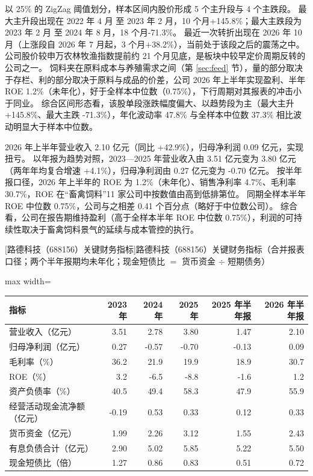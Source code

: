  以 25\% 的 ZigZag 阈值划分，样本区间内股价形成 5 个主升段与 4 个主跌段。 最大主升段出现在 2022 年 4 月 至 2023 年 2 月，10 个月+145.8\%；最大主跌段为 2023 年 2 月 至 2024 年 8 月，18 个月-71.3\%。 最近一次转折出现在 2026 年 10 月（上涨段自 2026 年 7 月起，3 个月+38.2\%），当前处于该段之后的震荡之中。 公司股价较申万农林牧渔指数提前约 21 个月见底，是板块中较早定价周期反转的公司之一。 饲料夹在原料成本与养殖需求之间（第 \ref{sec:feed} 节），量的部分取决于存栏、利的部分取决于原料与成品的价差，公司 2026 年上半年实现盈利、半年 ROE 1.2\%（未年化），好于全样本中位数（0.75\%），下行周期对其报表的冲击小于同业。 综合区间形态看，该股单段涨跌幅度偏大、以趋势段为主（最大主升 +145.8\%、最大主跌 -71.3\%），年化波动率 47.8\% 与全样本中位数 37.3\% 相比波动明显大于样本中位数。

 2026 年上半年营业收入 2.10 亿元（同比 +42.9\%），归母净利润 0.09 亿元，实现扭亏。 以年报为趋势对照，2023---2025 年营业收入由 3.51 亿元变为 3.80 亿元（两年年均复合增速 +4.1\%），归母净利润由 0.27 亿元变为 -0.70 亿元。 按半年报口径，2026 年上半年的 ROE 为 1.2\%（未年化）、销售净利率 4.7\%、毛利率 30.7\%，ROE 在“畜禽饲料”11 家公司中按数值由高到低排第位。 同期全样本半年 ROE 中位数 0.75\%，公司与之相差 0.41 个百分点（略好于中位数公司）。 综合看，公司在报告期维持盈利（高于全样本半年 ROE 中位数 0.75\%），利润的可持续性取决于畜禽饲料景气的延续与成本管控的执行。

\begin{center}\small\setlength{\tabcolsep}{3.4pt}
[路德科技（688156）关键财务指标]{路德科技（688156）关键财务指标（合并报表口径；两个半年报期均未年化；现金短债比 $=$ 货币资金 $\div$ 短期债务）}
\begin{adjustbox}{max width=\textwidth}
\begin{tabular}{@{}lrrrrr@{}}
\toprule
指标 & 2023 年 & 2024 年 & 2025 年 & 2025 年半年报 & 2026 年半年报 \\
\midrule
营业收入（亿元） & 3.51 & 2.78 & 3.80 & 1.47 & 2.10 \\
归母净利润（亿元） & 0.27 & -0.57 & -0.70 & -0.13 & 0.09 \\
毛利率（\%） & 36.2 & 21.9 & 19.9 & 18.9 & 30.7 \\
ROE（\%） & 3.2 & -6.5 & -8.8 & -1.6 & 1.2 \\
资产负债率（\%） & 40.5 & 49.4 & 58.3 & 47.9 & 55.9 \\
经营活动现金流净额（亿元） & -0.19 & 0.53 & 0.33 & 0.12 & 0.33 \\
货币资金（亿元） & 1.99 & 2.26 & 3.12 & 1.55 & 2.43 \\
有息负债合计（亿元） & 2.90 & 5.02 & 5.85 & 5.22 & 5.50 \\
现金短债比（倍） & 1.27 & 0.86 & 0.83 & 0.51 & 0.72 \\
\bottomrule
\end{tabular}
\end{adjustbox}
\end{center}

